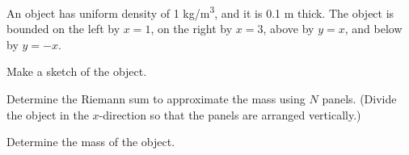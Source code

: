 \begin{problem}
\item An object has uniform density of 1 kg/m\textsuperscript{3}, and
  it is 0.1 m thick. The object is bounded on the left by $x=1$, on
  the right by $x=3$, above by $y=x$, and below by $y=-x$.
  \begin{subproblem}
  \item Make a sketch of the object.
    \vfill
  \item Determine the Riemann sum to approximate the mass using $N$
    panels. (Divide the object in the $x$-direction so that the panels
    are arranged vertically.)
    \vfill
  \item Determine the mass of the object.
    \vfill
  \end{subproblem}
\end{problem}



